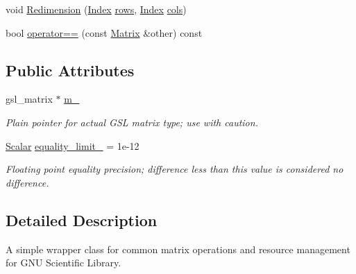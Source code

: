 \begin{DoxyCompactItemize}
\item 
void \hyperlink{classgsl_1_1_matrix_a54cc5ce3952ab512617a1cf93a611f64}{Redimension} (\hyperlink{typedefs_8h_a5d7deb06d9443e7d4a47bf078638cc91}{Index} \hyperlink{classgsl_1_1_matrix_a459c986967f558d242020a7d6c5feb0b}{rows}, \hyperlink{typedefs_8h_a5d7deb06d9443e7d4a47bf078638cc91}{Index} \hyperlink{classgsl_1_1_matrix_a19034005cec347cd9e3879c06f59b4eb}{cols})
\item 
bool \hyperlink{classgsl_1_1_matrix_ab51de3558c8bbaed7939714c8131d0ee}{operator==} (const \hyperlink{classgsl_1_1_matrix}{Matrix} \&other) const 
\end{DoxyCompactItemize}
\subsection*{Public Attributes}
\begin{DoxyCompactItemize}
\item 
gsl\+\_\+matrix $\ast$ \hyperlink{classgsl_1_1_matrix_ac9b224f97485473b3e7f0b0b70859db4}{m\+\_\+}
\begin{DoxyCompactList}\small\item\em Plain pointer for actual G\+S\+L matrix type; use with caution. \end{DoxyCompactList}\item 
\hyperlink{typedefs_8h_a508fc58b5dc3c81865305f6498457063}{Scalar} \hyperlink{classgsl_1_1_matrix_af396387bb6247e141133479ac9808630}{equality\+\_\+limit\+\_\+} = 1e-\/12
\begin{DoxyCompactList}\small\item\em Floating point equality precision; difference less than this value is considered no difference. \end{DoxyCompactList}\end{DoxyCompactItemize}


\subsection{Detailed Description}
A simple wrapper class for common matrix operations and resource management for G\+N\+U Scientific Library. 

